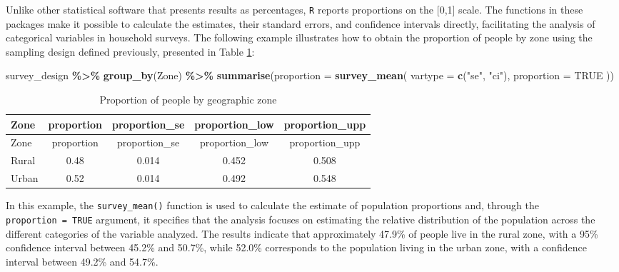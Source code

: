 \documentclass[
  english,
  12pt,
]{book}
\newenvironment{Shaded}{\begin{snugshade}}{\end{snugshade}}
\newcommand{\AttributeTok}[1]{\textcolor[rgb]{0.13,0.29,0.53}{#1}}
\newcommand{\ConstantTok}[1]{\textcolor[rgb]{0.56,0.35,0.01}{#1}}
\newcommand{\FunctionTok}[1]{\textcolor[rgb]{0.13,0.29,0.53}{\textbf{#1}}}
\newcommand{\NormalTok}[1]{#1}
\newcommand{\SpecialCharTok}[1]{\textcolor[rgb]{0.81,0.36,0.00}{\textbf{#1}}}
\newcommand{\StringTok}[1]{\textcolor[rgb]{0.31,0.60,0.02}{#1}}
\begin{document}
Unlike other statistical software that presents results as percentages, \texttt{R} reports proportions on the {[}0,1{]} scale. The functions in these packages make it possible to calculate the estimates, their standard errors, and confidence intervals directly, facilitating the analysis of categorical variables in household surveys. The following example illustrates how to obtain the proportion of people by zone using the sampling design defined previously, presented in Table \ref{tab:tab-prop-zona}:

\begin{Shaded}
\begin{Highlighting}[]
\NormalTok{survey\_design }\SpecialCharTok{\%\textgreater{}\%}
  \FunctionTok{group\_by}\NormalTok{(Zone) }\SpecialCharTok{\%\textgreater{}\%}
  \FunctionTok{summarise}\NormalTok{(}\AttributeTok{proportion =} \FunctionTok{survey\_mean}\NormalTok{(}
    \AttributeTok{vartype =} \FunctionTok{c}\NormalTok{(}\StringTok{"se"}\NormalTok{, }\StringTok{"ci"}\NormalTok{),}
    \AttributeTok{proportion =} \ConstantTok{TRUE}
\NormalTok{  ))}
\end{Highlighting}
\end{Shaded}

\begin{longtable}[]{@{}lcccc@{}}
\caption{\label{tab:tab-prop-zona}Proportion of people by geographic zone}\tabularnewline
\toprule\noalign{}
Zone & proportion & proportion\_se & proportion\_low & proportion\_upp \\
\midrule\noalign{}
\endfirsthead
\toprule\noalign{}
Zone & proportion & proportion\_se & proportion\_low & proportion\_upp \\
\midrule\noalign{}
\endhead
\bottomrule\noalign{}
\endlastfoot
Rural & 0.48 & 0.014 & 0.452 & 0.508 \\
Urban & 0.52 & 0.014 & 0.492 & 0.548 \\
\end{longtable}

In this example, the \texttt{survey\_mean()} function is used to calculate the estimate of population proportions and, through the \texttt{proportion\ =\ TRUE} argument, it specifies that the analysis focuses on estimating the relative distribution of the population across the different categories of the variable analyzed. The results indicate that approximately 47.9\% of people live in the rural zone, with a 95\% confidence interval between 45.2\% and 50.7\%, while 52.0\% corresponds to the population living in the urban zone, with a confidence interval between 49.2\% and 54.7\%.
\end{document}

